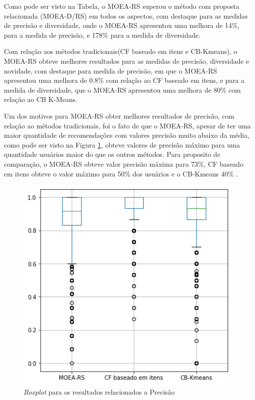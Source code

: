 Como pode ser visto na Tabela, o MOEA-RS superou o método com proposta relacionada (MOEA-D/RS) em todos os aspectos, com destaque para as medidas de precisão e diversidade, onde o MOEA-RS apresentou uma melhora de 14\%, para a medida de precisão, e 178\% para a medida de diversidade. 

Com relação aos métodos tradicionais(CF baseado em itens e CB-Kmeans), o MOEA-RS obteve melhores resultados para as medidas de precisão, diversidade e novidade, com destaque para medida de precisão, em que o MOEA-RS apresentou uma melhora de 0.8\% com relação ao CF baseado em itens, e para a medida de diversidade, que o MOEA-RS apresentou uma melhora de 80\% com relação ao CB K-Means.

Um dos motivos para MOEA-RS obter melhores resultados de precisão, com relação ao métodos tradicionais, foi o fato de que o MOEA-RS, apesar de ter uma maior quantidade de recomendações com valores precisão muito abaixo da média, como pode ser visto na Figura \ref{fig:boxplot_precision}, obteve valores de precisão máximo para uma quantidade usuários maior do que os outros métodos. Para proposito de comparação, o MOEA-RS obteve valor precisão máxima para 73\%, CF baseado em itens obteve o valor máximo para 50\% dos usuários e o CB-Kmeans 40\% .

\begin{figure}[h!]
   
    \centering
    \includegraphics[width=14cm]{Imagens/precisions_boxplot.png}
   \caption{\textit{Boxplot} para os resultados relacionados a Precisão}
    \label{fig:boxplot_precision}
    
\end{figure}

